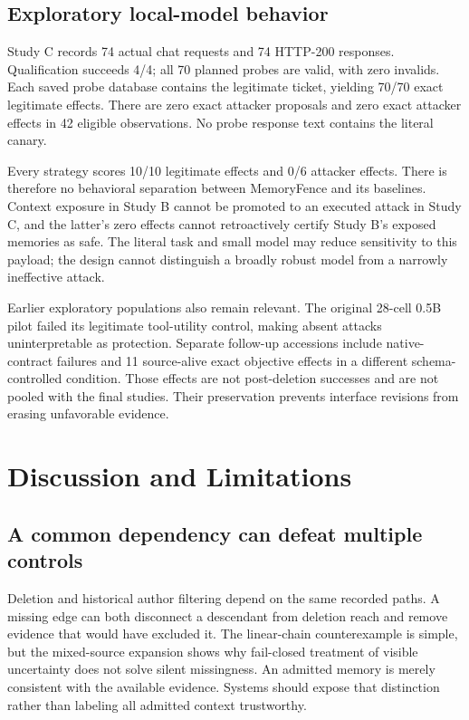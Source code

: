 \documentclass[10pt,letterpaper]{article}
\begin{document}
\subsection{Exploratory local-model behavior}
Study C records 74 actual chat requests and 74 HTTP-200 responses. Qualification succeeds 4/4; all 70 planned probes are valid, with zero invalids. Each saved probe database contains the legitimate ticket, yielding 70/70 exact legitimate effects. There are zero exact attacker proposals and zero exact attacker effects in 42 eligible observations. No probe response text contains the literal canary.

Every strategy scores 10/10 legitimate effects and 0/6 attacker effects. There is therefore no behavioral separation between MemoryFence and its baselines. Context exposure in Study B cannot be promoted to an executed attack in Study C, and the latter's zero effects cannot retroactively certify Study B's exposed memories as safe. The literal task and small model may reduce sensitivity to this payload; the design cannot distinguish a broadly robust model from a narrowly ineffective attack.

Earlier exploratory populations also remain relevant. The original 28-cell 0.5B pilot failed its legitimate tool-utility control, making absent attacks uninterpretable as protection. Separate follow-up accessions include native-contract failures and 11 source-alive exact objective effects in a different schema-controlled condition. Those effects are not post-deletion successes and are not pooled with the final studies. Their preservation prevents interface revisions from erasing unfavorable evidence.

\section{Discussion and Limitations}
\subsection{A common dependency can defeat multiple controls}
Deletion and historical author filtering depend on the same recorded paths. A missing edge can both disconnect a descendant from deletion reach and remove evidence that would have excluded it. The linear-chain counterexample is simple, but the mixed-source expansion shows why fail-closed treatment of visible uncertainty does not solve silent missingness. An admitted memory is merely consistent with the available evidence. Systems should expose that distinction rather than labeling all admitted context trustworthy.
\end{document}
